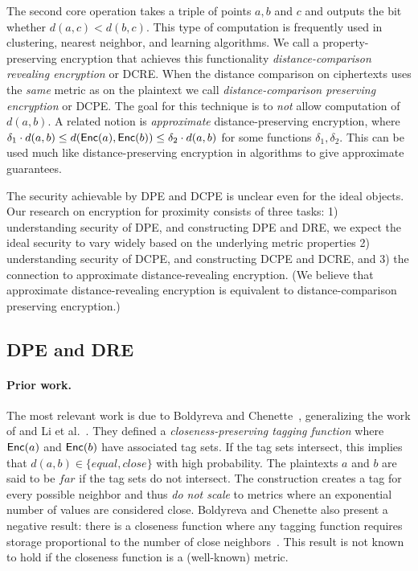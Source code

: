 The second core operation takes a triple of points $a,b$ and $c$ and outputs the bit whether $d(a,c)<d(b,c)$.  This type of computation is frequently used in clustering, nearest neighbor, and learning algorithms.   We call a property-preserving encryption that achieves this functionality \emph{distance-comparison revealing encryption} or DCRE. When the distance comparison on ciphertexts uses the \emph{same} metric as on the plaintext we call \emph{distance-comparison preserving encryption} or DCPE.  The goal for this technique is to \emph{not} allow computation of $d(a,b)$.
 A related notion is \emph{approximate} distance-preserving encryption, where  $\delta_1 \cdot d(a,b) \leq d(\mathsf{Enc}(a), \mathsf{Enc}(b)) \leq \delta_2  \cdot d(a,b)$ for some functions $\delta_1, \delta_2$.  This can be used much like distance-preserving encryption in algorithms to give approximate guarantees.

The security achievable by DPE and DCPE is unclear even for the ideal objects.
Our research on encryption for proximity  consists of three tasks: 1) understanding security of DPE, and constructing DPE and DRE, we expect the ideal security to vary widely based on the underlying metric properties 2) understanding security of DCPE, and constructing DCPE and DCRE,  and 3) the connection to approximate distance-revealing encryption. (We believe that approximate distance-revealing encryption is equivalent to distance-comparison preserving encryption.)

\subsection{DPE and DRE}

\paragraph{Prior work.}
The most relevant work is due to Boldyreva and Chenette~\cite{boldyreva2014efficient}, generalizing the work of and Li et al.~\cite{li2010fuzzy,wang2013efficient}. They defined a \emph{closeness-preserving tagging function} where $\mathsf{Enc}(a)$ and $\mathsf{Enc}(b)$ have associated tag sets.  If the tag sets intersect, this implies that $d(a,b) \in\{equal, close\}$ with high probability.  The plaintexts $a$ and $b$ are said to be $far$ if the tag sets do not intersect.  
%
The construction creates a tag for every possible neighbor and thus {\em do not scale} to metrics where an exponential number of values are considered close. Boldyreva and Chenette also present a negative result: there is a closeness function where any tagging function requires storage proportional to the number of close neighbors~\cite[Theorem 5.2]{boldyreva2014efficient}.  This result is not known to hold if the closeness function is a (well-known) metric.  

